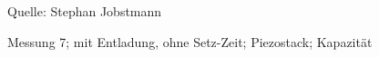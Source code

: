 \documentclass[12pt]{scrreprt} %
\begin{document}
\begin {figure}[htbp]
\caption{Messung 7; mit Entladung, ohne Setz-Zeit; Piezostack; Kapazität}
      \begin{center}
      \end{center}
Quelle: Stephan Jobstmann
\label{fig:2.7}
\end{figure}
\end{document}
